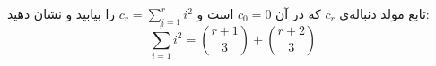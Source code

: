 \EXERCISE
تابع مولد دنباله‌ی
$c_r$
که در آن
$c_0 = 0$
است و
$c_r = \sum_{i=1}^{r} i^2$
را بیابید و نشان دهید:
$$\sum_{i=1}^{r} i^2 = \binom{r + 1}{3} + \binom{r + 2}{3}$$